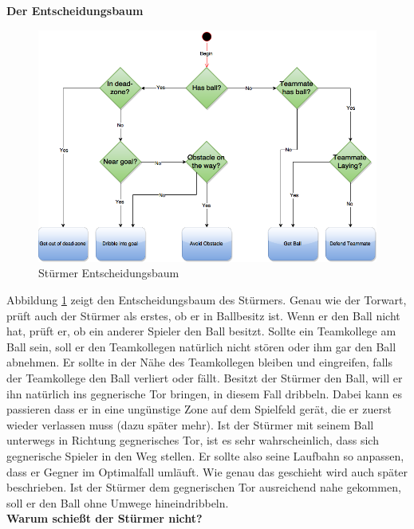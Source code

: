 \documentclass[fontsize=12pt,a4paper,final]{scrartcl}[2003/01/01]
\makeatletter
\def\ScaleIfNeeded{%
	\ifdim\Gin@nat@width>\linewidth
		\linewidth
	\else
		\Gin@nat@width
	\fi
}
\makeatother
\begin{document}
\textbf{Der Entscheidungsbaum}
\\

\begin{figure}[H]
	\centering
	\includegraphics[width=\ScaleIfNeeded]{Grafiken/KI/attackerCenter_v2}
	\caption{Stürmer Entscheidungsbaum}
	\label{Stuermer Entscheidungsbaum}
\end{figure}

Abbildung \ref{Stuermer Entscheidungsbaum} zeigt den Entscheidungsbaum des Stürmers. Genau wie der Torwart, prüft auch der Stürmer als erstes, ob er in Ballbesitz ist. Wenn er den Ball nicht hat, prüft er, ob ein anderer Spieler den Ball besitzt. Sollte ein Teamkollege am Ball sein, soll er den Teamkollegen natürlich nicht stören oder ihm gar den Ball abnehmen. Er sollte in der Nähe des Teamkollegen bleiben und eingreifen, falls der Teamkollege den Ball verliert oder fällt. Besitzt der Stürmer den Ball, will er ihn natürlich ins gegnerische Tor bringen, in diesem Fall dribbeln. Dabei kann es passieren dass er in eine ungünstige Zone auf dem Spielfeld gerät, die er zuerst wieder verlassen muss (dazu später mehr). Ist der Stürmer mit seinem Ball unterwegs in Richtung gegnerisches Tor, ist es sehr wahrscheinlich, dass sich gegnerische Spieler in den Weg stellen. Er sollte also seine Laufbahn so anpassen, dass er Gegner im Optimalfall umläuft. Wie genau das geschieht wird auch später beschrieben. Ist der Stürmer dem gegnerischen Tor ausreichend nahe gekommen, soll er den Ball ohne Umwege hineindribbeln.
\\

\textbf{Warum schießt der Stürmer nicht?}
\\
\end{document}
